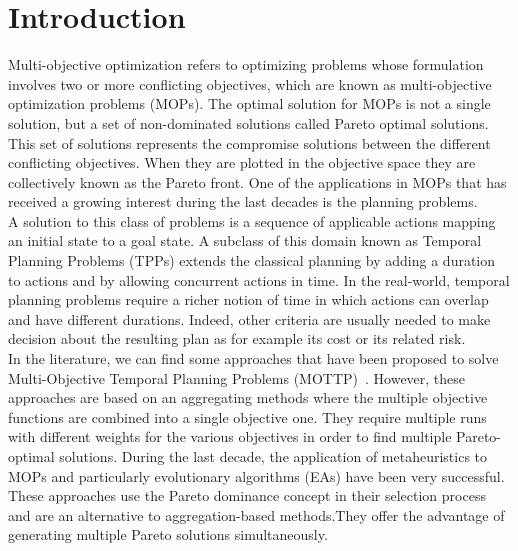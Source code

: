 \documentclass{llncs}
\begin{document}
\section{Introduction}

Multi-objective optimization refers to optimizing problems whose formulation involves two or more conflicting objectives, 
which are known as multi-objective optimization
problems (MOPs).
The optimal solution for MOPs is not a single solution, but a set of non-dominated solutions called Pareto optimal solutions.
This set of solutions represents the compromise solutions between the different conflicting objectives. When they are plotted in the objective space they are collectively known as the Pareto front. 
One of the applications in MOPs that has received a growing interest during the last decades is the planning problems.\\
A solution to this class of problems is a sequence of applicable actions mapping an initial state to a goal state.
A subclass of this domain known as Temporal Planning Problems (TPPs) extends the classical planning by adding a duration to actions and by allowing concurrent actions in time.
In the real-world, temporal planning problems require a richer notion of time in which actions can overlap and have different durations. Indeed, other criteria are usually needed to make decision
about the resulting plan as for example its cost or its related risk.\\ 
\indent In the literature, we can find some approaches that have been proposed to solve Multi-Objective Temporal Planning Problems (MOTTP)~\cite{Refanidis2003,Do2003}.
However, these approaches are based on an aggregating methods where the multiple objective functions are combined into a single objective one.
They require multiple runs with different weights for the various objectives in order to find multiple Pareto-optimal solutions.
During the last decade, the application of metaheuristics to MOPs  and particularly evolutionary algorithms (EAs) have been very successful.
These  approaches use the Pareto dominance concept in their selection process and are an alternative to aggregation-based methods.They offer the advantage of generating multiple Pareto
solutions simultaneously.\\ %
\end{document}
